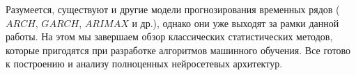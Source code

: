 Разумеется, существуют и другие модели прогнозирования временных рядов  ($ARCH$, $GARCH$, 
$ARIMAX$ и др.), однако они уже выходят за рамки данной работы. На этом мы завершаем обзор 
классических статистических методов, которые пригодятся при разработке алгоритмов машинного обучения. 
Все готово к построению и анализу полноценных нейросетевых архитектур.










